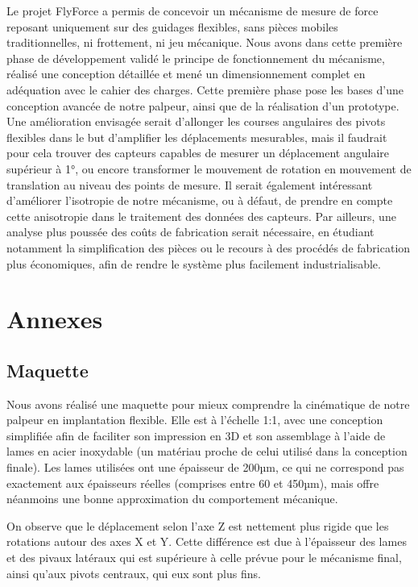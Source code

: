 \documentclass[a4paper, 11pt]{article} %
\begin{document}
Le projet FlyForce a permis de concevoir un mécanisme de mesure de force reposant uniquement sur des guidages flexibles, sans pièces mobiles traditionnelles, ni frottement, ni jeu mécanique. Nous avons dans cette première phase de développement validé le principe de fonctionnement du mécanisme, réalisé une conception détaillée et mené un dimensionnement complet en adéquation avec le cahier des charges. Cette première phase pose les bases d’une conception avancée de notre palpeur, ainsi que de la réalisation d’un prototype. Une amélioration envisagée serait d'allonger les courses angulaires  des pivots flexibles dans le but d'amplifier les déplacements mesurables, mais il faudrait pour cela trouver des capteurs capables de mesurer un déplacement angulaire supérieur à 1°, ou encore transformer le mouvement de rotation en mouvement de translation au niveau des points de mesure. Il serait également intéressant d'améliorer l'isotropie de notre mécanisme, ou à défaut, de prendre en compte cette anisotropie dans le traitement des données des capteurs. Par ailleurs, une analyse plus poussée des coûts de fabrication serait nécessaire, en étudiant notamment la simplification des pièces ou le recours à des procédés de fabrication plus économiques, afin de rendre le système plus facilement industrialisable.



\section{Annexes} \label{Annexes}
\subsection{Maquette}
Nous avons réalisé une maquette pour mieux comprendre la cinématique de notre palpeur en implantation flexible. Elle est à l’échelle 1:1, avec une conception simplifiée afin de faciliter son impression en 3D et son assemblage à l’aide de lames en acier inoxydable (un matériau proche de celui utilisé dans la conception finale). Les lames utilisées ont une épaisseur de 200µm, ce qui ne correspond pas exactement aux épaisseurs réelles (comprises entre 60 et 450µm), mais offre néanmoins une bonne approximation du comportement mécanique.

On observe que le déplacement selon l’axe Z est nettement plus rigide que les rotations autour des axes X et Y. Cette différence est due à l’épaisseur des lames et des pivaux latéraux qui est supérieure à celle prévue pour le mécanisme final, ainsi qu’aux pivots centraux, qui eux sont plus fins.
\end{document}
